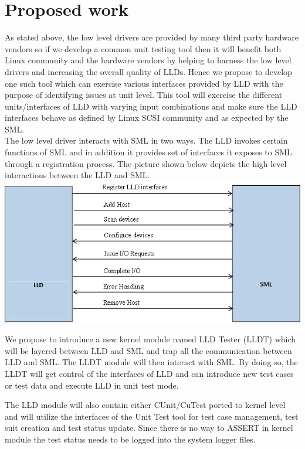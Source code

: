 \vspace{3 mm}
\section{Proposed work}\vspace{3 mm}

As stated above, the low level drivers are provided by many third party hardware vendors so if we develop a common unit testing tool then it will benefit both Linux community and the hardware vendors by helping to harness the low level drivers and increasing the overall quality of LLDs. Hence we propose to develop one such tool which can exercise various interfaces provided by LLD with the purpose of identifying issues at unit level.  This tool will exercise the different units/interfaces of LLD with varying input combinations and make sure the LLD interfaces behave as defined by Linux SCSI community and as expected by the SML. \\

The low level driver interacts with SML in two ways.  The LLD invokes certain functions of SML and in addition it provides set of interfaces it exposes to SML through a registration process.  The picture shown below depicts the high level interactions between the LLD and SML. \\

\includegraphics[scale=1]
{fig5}

We propose to introduce a new kernel module named LLD Tester (LLDT) which will be layered between LLD and SML and trap all the communication between LLD and SML. The LLDT module will then interact with SML.  By doing so, the LLDT will get control of the interfaces of LLD and can introduce new test cases or test data and execute LLD in unit test mode. 

The LLD module will also contain either CUnit/CuTest ported to kernel level and will utilize the interfaces of the Unit Test tool for test case management, test suit creation and test status update.  Since there is no way to ASSERT in kernel module the test status needs to be logged into the system logger files.


